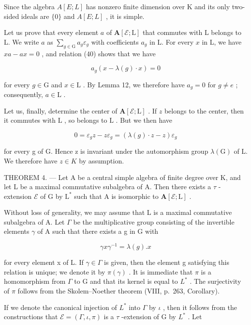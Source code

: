 Since the algebra \(A[E;L]\) has nonzero finite dimension over K and its only two-sided ideals are \(\{0\}\) and \(A[E;L]\) , it is simple.

Let us prove that every element \(a\) of \(\mathbf{A}[\mathcal{E};\mathrm{L}]\) that commutes with L belongs to L. We write \(a\) as \(\sum_{g\in \mathrm{G}}a_g\varepsilon_g\) with coefficients \(a_{g}\) in L. For every \(x\) in L, we have \(xa - ax = 0\) , and relation (40) shows that we have

\[
a _ {g} (x - \lambda (g) \cdot x) = 0\tag{41}
\]

for every \(g \in \mathrm{G}\) and \(x \in \mathrm{L}\) . By Lemma 12, we therefore have \(a_g = 0\) for \(g \neq e\) ; consequently, \(a \in \mathrm{L}\) .

Let us, finally, determine the center of \(\mathbf{A}[\mathcal{E};\mathrm{L}]\) . If \(z\) belongs to the center, then it commutes with \(\mathrm{L}\) , so belongs to \(\mathrm{L}\) . But we then have

\[
0 = \varepsilon_ {g} z - z \varepsilon_ {g} = (\lambda (g) \cdot z - z) \varepsilon_ {g}
\]

for every g of G. Hence z is invariant under the automorphism group \(\lambda(\mathrm{G})\) of L. We therefore have \(z \in K\) by assumption.

THEOREM 4. --- Let A be a central simple algebra of finite degree over K, and let L be a maximal commutative subalgebra of A. Then there exists a \(\tau\) -extension \(\mathcal{E}\) of G by \(\mathrm{L}^*\) such that A is isomorphic to \(\mathbf{A}[\mathcal{E};\mathrm{L}]\) .

Without loss of generality, we may assume that L is a maximal commutative subalgebra of A. Let \(\Gamma\) be the multiplicative group consisting of the invertible elements \(\gamma\) of A such that there exists a g in G with

\[
\gamma x \gamma^ {- 1} = \lambda (g). x\tag{42}
\]

for every element x of L. If \(\gamma \in \Gamma\) is given, then the element g satisfying this relation is unique; we denote it by \(\pi(\gamma)\) . It is immediate that \(\pi\) is a homomorphism from \(\Gamma\) to G and that its kernel is equal to \(L^{*}\) . The surjectivity of \(\pi\) follows from the Skolem--Noether theorem (VIII, p.~263, Corollary).

If we denote the canonical injection of \(L^{*}\) into \(\Gamma\) by \(\iota\) , then it follows from the constructions that \(\mathcal{E} = (\Gamma, \iota, \pi)\) is a \(\tau\) -extension of G by \(L^{*}\) . Let

